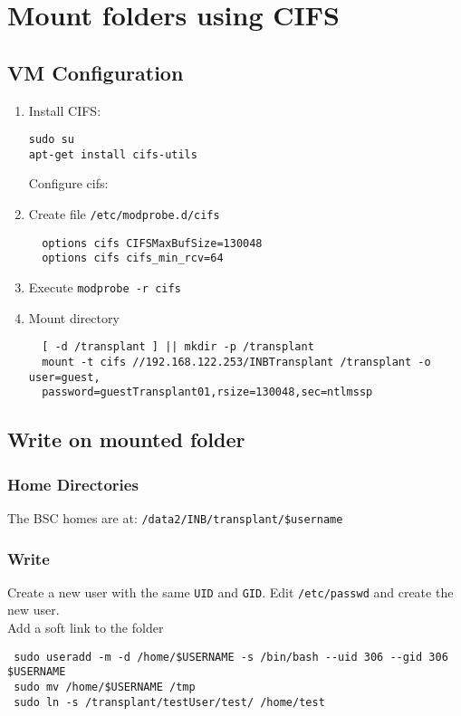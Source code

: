 \documentclass[a4paper,10pt]{article}
\begin{document}
\section{Mount folders using CIFS}
\subsection{VM Configuration}
\begin{enumerate}
\item Install CIFS:
\begin{verbatim}
sudo su
apt-get install cifs-utils
\end{verbatim}
Configure cifs:

 \item Create file \texttt{/etc/modprobe.d/cifs}
 \begin{verbatim}
  options cifs CIFSMaxBufSize=130048
  options cifs cifs_min_rcv=64
 \end{verbatim}
 \item Execute \texttt{modprobe -r cifs}
 \item Mount directory 
 \begin{verbatim}
  [ -d /transplant ] || mkdir -p /transplant
  mount -t cifs //192.168.122.253/INBTransplant /transplant -o user=guest,
  password=guestTransplant01,rsize=130048,sec=ntlmssp
 \end{verbatim}
\end{enumerate}
\subsection{Write on mounted folder}
\subsubsection{Home Directories}
The BSC homes are at:
\texttt{/data2/INB/transplant/\$username}
\subsubsection{Write}
Create a new user with the same \texttt{UID} and \texttt{GID}. Edit \texttt{/etc/passwd} and create the new user.\\
Add a soft link to the folder 
\begin{verbatim}
 sudo useradd -m -d /home/$USERNAME -s /bin/bash --uid 306 --gid 306 $USERNAME
 sudo mv /home/$USERNAME /tmp
 sudo ln -s /transplant/testUser/test/ /home/test
\end{verbatim}
\end{document}
